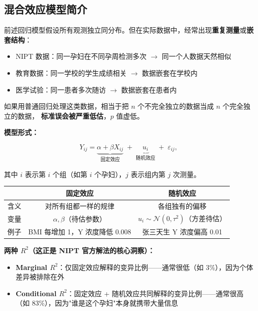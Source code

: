 \subsection{混合效应模型简介}

前述回归模型假设所有观测独立同分布。但在实际数据中，经常出现\textbf{重复测量}或\textbf{嵌套结构}：

\begin{itemize}
    \item NIPT 数据：同一孕妇在不同孕周检测多次 $\to$ 同一个人数据天然相似
    \item 教育数据：同一学校的学生成绩相关 $\to$ 数据嵌套在学校内
    \item 医学试验：同一患者多次随访 $\to$ 数据嵌套在患者内
\end{itemize}

如果用普通回归处理这类数据，相当于把 $n$ 个不完全独立的数据当成 $n$ 个完全独立的数据，
\textbf{标准误会被严重低估}，$p$ 值虚低。

\medskip
\textbf{模型形式：}

\begin{equation}
    Y_{ij} = \underbrace{\alpha + \beta X_{ij}}_{\text{固定效应}} \;+\; \underbrace{u_i}_{\text{随机效应}} \;+\; \varepsilon_{ij},
\end{equation}

其中 $i$ 表示第 $i$ 个组（如第 $i$ 个孕妇），$j$ 表示组内第 $j$ 次测量。

\begin{center}
\renewcommand{\arraystretch}{1.3}
\begin{tabular}{c|c|c}
\toprule
& \textbf{固定效应} & \textbf{随机效应} \\
\midrule
含义 & 对所有组都一样的规律 & 各组独有的偏移 \\
变量 & $\alpha, \beta$（待估参数） & $u_i \sim \mathcal{N}(0, \tau^2)$（方差待估） \\
例子 & BMI 每增加 1，Y 浓度降低 0.008 & 张三天生 Y 浓度偏高 0.01 \\
\bottomrule
\end{tabular}
\end{center}

\medskip
\textbf{两种 $R^2$（这正是 NIPT 官方解法的核心洞察）：}

\begin{itemize}
    \item \textbf{Marginal $R^2$}：仅固定效应解释的变异比例——通常很低（如 3\%），因为个体差异被排除在外
    \item \textbf{Conditional $R^2$}：固定效应 + 随机效应共同解释的变异比例——通常很高（如 83\%），因为"谁是这个孕妇"本身就携带大量信息
\end{itemize}

